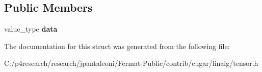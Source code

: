 \subsection*{Public Members}
\begin{DoxyCompactItemize}
\item 
\mbox{\label{structcugar_1_1_tensor_3_01_t_00_010_00_01_n_01_4_ab9cfe45fac1248ca186dd66b09f38111}} 
value\+\_\+type {\bfseries data}
\end{DoxyCompactItemize}


The documentation for this struct was generated from the following file\+:\begin{DoxyCompactItemize}
\item 
C\+:/p4research/research/jpantaleoni/\+Fermat-\/\+Public/contrib/cugar/linalg/tensor.\+h\end{DoxyCompactItemize}
